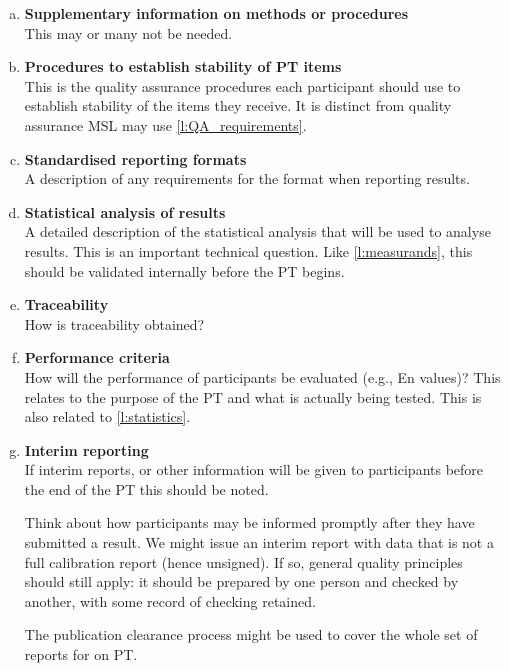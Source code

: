 \begin{enumerate}[a)]
\item	\textbf{Supplementary information on methods or procedures} \\
This may or many not be needed.

\item	\textbf{Procedures to establish stability of PT items} \\ \label{l:stability}%
This is the quality assurance procedures each participant should use to establish stability of the items they receive. It is distinct from quality assurance MSL may use \ref{l:QA_requirements}.

\item	\textbf{Standardised reporting formats} \\
A description of any requirements for the format when reporting results. 

\item	\textbf{Statistical analysis of results} \\ \label{l:statistics}%
A detailed description of the statistical analysis that will be used to analyse results.
This is an important technical question. Like \ref{l:measurands}, this should be validated internally before the PT begins.

\item	\textbf{Traceability} \\
How is traceability obtained?

\item	\textbf{Performance criteria} \\
How will the performance of participants be evaluated (e.g., En values)? This relates to the purpose of the PT and what is actually being tested. This is also related to \ref{l:statistics}. 


\item	\textbf{Interim reporting} \\
If interim reports, or other information will be given to participants before the end of the PT this should be noted. 

Think about how participants may be informed promptly after they have submitted a result. We might issue an interim report with data that is not a full calibration report (hence unsigned). If so, general quality principles should still apply: it should be prepared by one person and checked by another, with some record of checking retained. 

The publication clearance process might be used to cover the whole set of reports for on PT. 


\end{enumerate}
